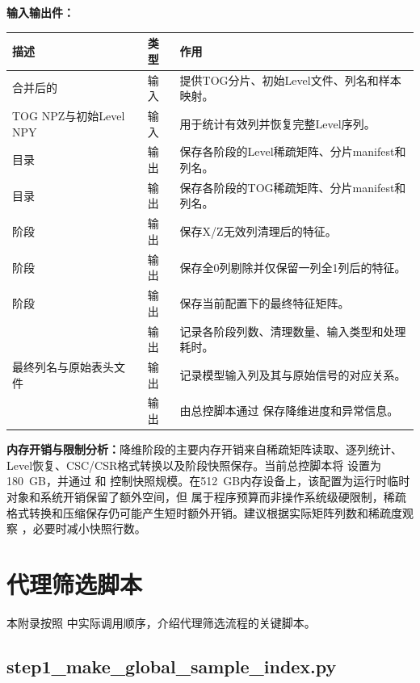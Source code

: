 \textbf{输入输出件：}
\begin{longtable}{L{0.34\textwidth}L{0.13\textwidth}L{0.41\textwidth}}
\toprule 描述 & 类型 & 作用 \\ \midrule
合并后的  & 输入 & 提供TOG分片、初始Level文件、列名和样本映射。 \\
TOG NPZ与初始Level NPY & 输入 & 用于统计有效列并恢复完整Level序列。 \\
目录 & 输出 & 保存各阶段的Level稀疏矩阵、分片manifest和列名。 \\
目录 & 输出 & 保存各阶段的TOG稀疏矩阵、分片manifest和列名。 \\
阶段 & 输出 & 保存X/Z无效列清理后的特征。 \\
阶段 & 输出 & 保存全0列剔除并仅保留一列全1列后的特征。 \\
阶段 & 输出 & 保存当前配置下的最终特征矩阵。 \\
 & 输出 & 记录各阶段列数、清理数量、输入类型和处理耗时。 \\
最终列名与原始表头文件 & 输出 & 记录模型输入列及其与原始信号的对应关系。 \\
 & 输出 & 由总控脚本通过  保存降维进度和异常信息。 \\
\bottomrule
\end{longtable}

\textbf{内存开销与限制分析：}降维阶段的主要内存开销来自稀疏矩阵读取、逐列统计、Level恢复、CSC/CSR格式转换以及阶段快照保存。当前总控脚本将  设置为180~GB，并通过  和  控制快照规模。在512~GB内存设备上，该配置为运行时临时对象和系统开销保留了额外空间，但  属于程序预算而非操作系统级硬限制，稀疏格式转换和压缩保存仍可能产生短时额外开销。建议根据实际矩阵列数和稀疏度观察 ，必要时减小快照行数。


\chapter{代理筛选脚本}

本附录按照  中实际调用顺序，介绍代理筛选流程的关键脚本。



\section{step1\_make\_global\_sample\_index.py}

